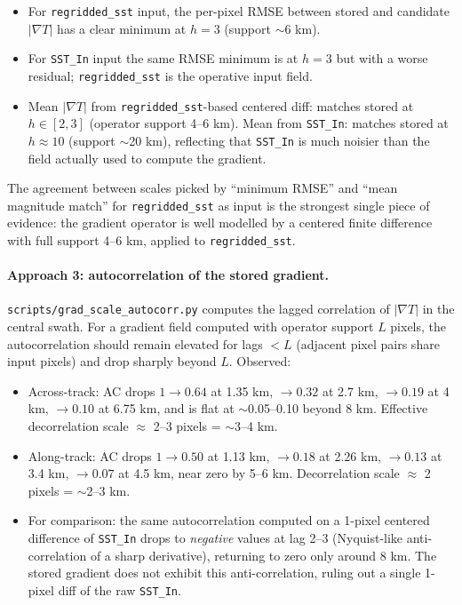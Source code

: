 \documentclass[11pt]{article}
\begin{document}
\begin{itemize}
  \item For \texttt{regridded\_sst} input, the per-pixel RMSE
    between stored and candidate $|\nabla T|$ has a clear minimum
    at $h=3$ (support $\sim$6 km).
  \item For \texttt{SST\_In} input the same RMSE minimum is at
    $h=3$ but with a worse residual; \texttt{regridded\_sst}
    is the operative input field.
  \item Mean $|\nabla T|$ from \texttt{regridded\_sst}-based
    centered diff: matches stored at $h \in [2,3]$ (operator
    support 4--6 km). Mean from \texttt{SST\_In}: matches stored
    at $h\approx 10$ (support $\sim$20 km), reflecting that
    \texttt{SST\_In} is much noisier than the field actually
    used to compute the gradient.
\end{itemize}

The agreement between scales picked by ``minimum RMSE'' and ``mean
magnitude match'' for \texttt{regridded\_sst} as input is the
strongest single piece of evidence: the gradient operator is well
modelled by a centered finite difference with full support
4--6 km, applied to \texttt{regridded\_sst}.

\paragraph{Approach 3: autocorrelation of the stored gradient.}
\texttt{scripts/grad\_scale\_autocorr.py} computes the lagged
correlation of $|\nabla T|$ in the central swath. For a gradient
field computed with operator support $L$ pixels, the
autocorrelation should remain elevated for lags $< L$ (adjacent
pixel pairs share input pixels) and drop sharply beyond $L$.
Observed:
\begin{itemize}
  \item Across-track: AC drops $1 \to 0.64$ at 1.35 km, $\to 0.32$
    at 2.7 km, $\to 0.19$ at 4 km, $\to 0.10$ at 6.75 km, and is
    flat at $\sim$0.05--0.10 beyond 8 km. Effective decorrelation
    scale $\approx$ 2--3 pixels = $\sim$3--4 km.
  \item Along-track: AC drops $1 \to 0.50$ at 1.13 km, $\to 0.18$
    at 2.26 km, $\to 0.13$ at 3.4 km, $\to 0.07$ at 4.5 km, near
    zero by 5--6 km. Decorrelation scale $\approx$ 2 pixels =
    $\sim$2--3 km.
  \item For comparison: the same autocorrelation computed on a
    1-pixel centered difference of \texttt{SST\_In} drops to
    \emph{negative} values at lag 2--3 (Nyquist-like
    anti-correlation of a sharp derivative), returning to zero
    only around 8 km. The stored gradient does not exhibit this
    anti-correlation, ruling out a single 1-pixel diff of the
    raw \texttt{SST\_In}.
\end{itemize}
\end{document}
